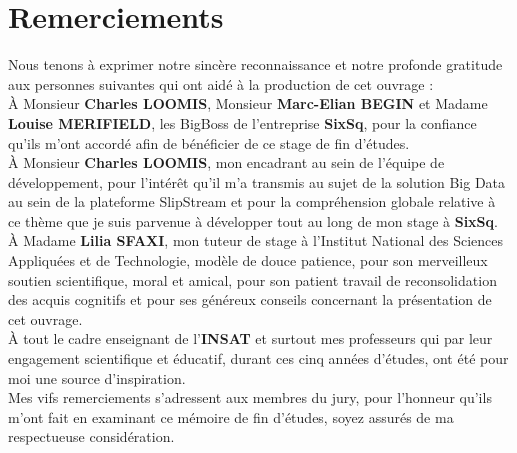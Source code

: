\chapter*{Remerciements}

Nous tenons à exprimer notre sincère reconnaissance et notre profonde gratitude aux personnes suivantes qui ont aidé à la production de cet ouvrage :\\

À Monsieur \textbf{Charles LOOMIS}, Monsieur \textbf{Marc-Elian BEGIN} et Madame \textbf{Louise MERIFIELD}, les BigBoss de l'entreprise \textbf{SixSq}, pour la confiance qu'ils m'ont accordé afin de bénéficier de ce stage de fin d'études.\\

À Monsieur \textbf{Charles LOOMIS}, mon encadrant au sein de l'équipe de développement, pour l'intérêt qu'il m'a transmis au sujet de la solution Big Data au sein de la plateforme SlipStream et pour la compréhension globale relative à ce thème que je suis parvenue à développer tout au long de mon stage à \textbf{SixSq}.\\


À Madame \textbf{Lilia SFAXI}, mon tuteur de stage à l'Institut National des Sciences Appliquées et de Technologie, modèle de douce patience, pour son merveilleux soutien scientifique, moral et amical, pour son patient travail de reconsolidation des acquis cognitifs et pour ses généreux conseils concernant la présentation de cet ouvrage.\\


À tout le cadre enseignant de l'\textbf{INSAT} et surtout mes professeurs qui par leur engagement scientifique et éducatif, durant ces cinq années d'études, ont été pour moi une source d'inspiration.\\


Mes vifs remerciements s'adressent aux membres du jury, pour l'honneur qu'ils m'ont fait en examinant ce mémoire de fin d'études, soyez assurés de ma respectueuse considération.
